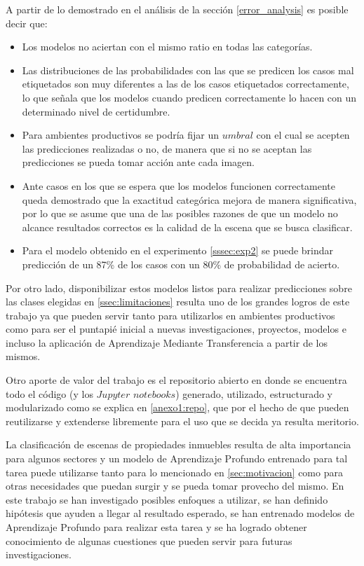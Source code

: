 A partir de lo demostrado en el análisis de la sección \ref{error_analysis} es posible decir que:
\begin{itemize}
	\item Los modelos no aciertan con el mismo ratio en todas las categorías.
	\item Las distribuciones de las probabilidades con las que se predicen los casos mal etiquetados son muy diferentes a las de los casos etiquetados correctamente, lo que señala que los modelos cuando predicen correctamente lo hacen con un determinado nivel de certidumbre.
	\item Para ambientes productivos se podría fijar un \(umbral\) con el cual se acepten las predicciones realizadas o no, de manera que si no se aceptan las predicciones se pueda tomar acción ante cada imagen.
	\item Ante casos en los que se espera que los modelos funcionen correctamente 
	queda demostrado que la exactitud categórica mejora de manera significativa, por lo que se asume que una de las posibles razones de que un modelo no alcance resultados correctos es la calidad de la escena que se busca clasificar.
	\item Para el modelo obtenido en el experimento \ref{sssec:exp2} se puede brindar predicción de un 87\% de los casos con un 80\% de probabilidad de acierto.
\end{itemize} 

Por otro lado, disponibilizar estos modelos listos para realizar predicciones sobre las clases elegidas en \ref{ssec:limitaciones} resulta uno de los grandes logros de este trabajo ya que pueden servir tanto para utilizarlos en ambientes productivos como para ser el puntapié inicial a nuevas investigaciones, proyectos, modelos e incluso la aplicación de Aprendizaje Mediante Transferencia a partir de los mismos.

Otro aporte de valor del trabajo es el repositorio abierto en donde se encuentra todo el código (y los \(Jupyter\) \(notebooks\)) generado, utilizado, estructurado y modularizado como se explica en \ref{anexo1:repo}, que por el hecho de que pueden reutilizarse y extenderse libremente para el uso que se decida ya resulta meritorio.

La clasificación de escenas de propiedades inmuebles resulta de alta importancia para algunos sectores y un modelo de Aprendizaje Profundo entrenado para tal tarea puede utilizarse tanto para lo mencionado en \ref{sec:motivacion} como para otras necesidades que puedan surgir y se pueda tomar provecho del mismo. En este trabajo se han investigado posibles enfoques a utilizar, se han definido hipótesis que ayuden a llegar al resultado esperado, se han entrenado modelos de Aprendizaje Profundo para realizar esta tarea y se ha logrado obtener conocimiento de algunas cuestiones que pueden servir para futuras investigaciones.

